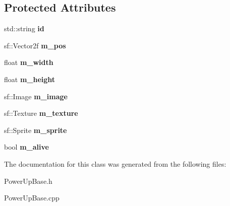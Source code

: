 \subsection*{Protected Attributes}
\begin{DoxyCompactItemize}
\item 
\mbox{\label{class_power_up_a3919e6ae0224a7da2bafdd5b54ce9f78}} 
std\+::string {\bfseries id}
\item 
\mbox{\label{class_power_up_ad8e33c49ed7402b09787fda50990f219}} 
sf\+::\+Vector2f {\bfseries m\+\_\+pos}
\item 
\mbox{\label{class_power_up_ae74d9fa9fc627f00d158c42ab2a3a062}} 
float {\bfseries m\+\_\+width}
\item 
\mbox{\label{class_power_up_af19e950b8cfa042872b83886a4969712}} 
float {\bfseries m\+\_\+height}
\item 
\mbox{\label{class_power_up_aa5ada70edd6dbe5adce8ecd78b6e71a8}} 
sf\+::\+Image {\bfseries m\+\_\+image}
\item 
\mbox{\label{class_power_up_ad1787bc5a27d9fe2c9c792b375ae236b}} 
sf\+::\+Texture {\bfseries m\+\_\+texture}
\item 
\mbox{\label{class_power_up_a9fd4c1f6b35b3ff5210ad1a4384e238e}} 
sf\+::\+Sprite {\bfseries m\+\_\+sprite}
\item 
\mbox{\label{class_power_up_a327eb8bdbc6c52111f709e8f174dbdf7}} 
bool {\bfseries m\+\_\+alive}
\end{DoxyCompactItemize}


The documentation for this class was generated from the following files\+:\begin{DoxyCompactItemize}
\item 
Power\+Up\+Base.\+h\item 
Power\+Up\+Base.\+cpp\end{DoxyCompactItemize}
